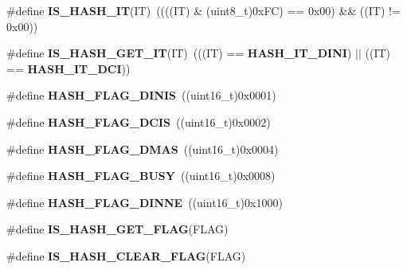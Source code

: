 \begin{DoxyCompactItemize}
\item 
\#define \textbf{ I\+S\+\_\+\+H\+A\+S\+H\+\_\+\+IT}(IT)~((((IT) \& (uint8\+\_\+t)0x\+F\+C) == 0x00) \&\& ((\+I\+T) != 0x00))
\item 
\#define \textbf{ I\+S\+\_\+\+H\+A\+S\+H\+\_\+\+G\+E\+T\+\_\+\+IT}(IT)~(((IT) == \textbf{ H\+A\+S\+H\+\_\+\+I\+T\+\_\+\+D\+I\+NI}) $\vert$$\vert$ ((IT) == \textbf{ H\+A\+S\+H\+\_\+\+I\+T\+\_\+\+D\+CI}))
\item 
\#define \textbf{ H\+A\+S\+H\+\_\+\+F\+L\+A\+G\+\_\+\+D\+I\+N\+IS}~((uint16\+\_\+t)0x0001)
\item 
\#define \textbf{ H\+A\+S\+H\+\_\+\+F\+L\+A\+G\+\_\+\+D\+C\+IS}~((uint16\+\_\+t)0x0002)
\item 
\#define \textbf{ H\+A\+S\+H\+\_\+\+F\+L\+A\+G\+\_\+\+D\+M\+AS}~((uint16\+\_\+t)0x0004)
\item 
\#define \textbf{ H\+A\+S\+H\+\_\+\+F\+L\+A\+G\+\_\+\+B\+U\+SY}~((uint16\+\_\+t)0x0008)
\item 
\#define \textbf{ H\+A\+S\+H\+\_\+\+F\+L\+A\+G\+\_\+\+D\+I\+N\+NE}~((uint16\+\_\+t)0x1000)
\item 
\#define \textbf{ I\+S\+\_\+\+H\+A\+S\+H\+\_\+\+G\+E\+T\+\_\+\+F\+L\+AG}(F\+L\+AG)
\item 
\#define \textbf{ I\+S\+\_\+\+H\+A\+S\+H\+\_\+\+C\+L\+E\+A\+R\+\_\+\+F\+L\+AG}(F\+L\+AG)
\end{DoxyCompactItemize}
